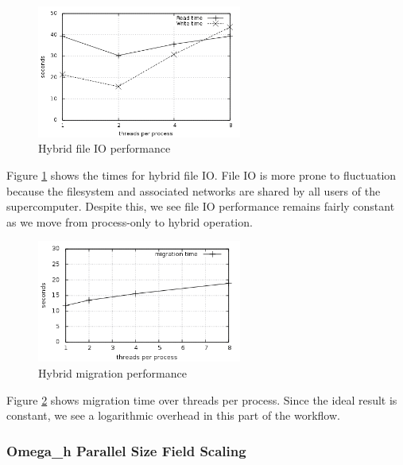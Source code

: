 \begin{figure}[!ht]
\begin{center}
\includegraphics[width=0.6\textwidth]{pcu_fileio.png}
\caption{Hybrid file IO performance}
\label{fig:pcu_fileio}
\end{center}
\end{figure}

Figure \ref{fig:pcu_fileio} shows the times for hybrid file IO.
File IO is more prone to fluctuation because the filesystem
and associated networks are shared by all users of the supercomputer.
Despite this, we see file IO performance remains
fairly constant as we move from process-only to hybrid operation.

\begin{figure}[!ht]
\begin{center}
\includegraphics[width=0.6\textwidth]{pcu_migrate.png}
\caption{Hybrid migration performance}
\label{fig:pcu_migrate}
\end{center}
\end{figure}

Figure \ref{fig:pcu_migrate} shows migration time over threads per process.
Since the ideal result is constant, we see a logarithmic overhead
in this part of the workflow.

\subsubsection{Omega\_h Parallel Size Field Scaling}
\label{sec:osh_scale}

